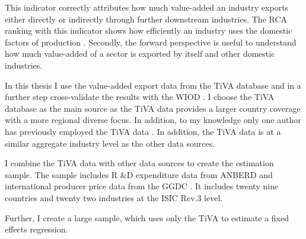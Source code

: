   This indicator correctly attributes how much value-added an industry exports either directly or indirectly through further downstream industries.
  The RCA ranking with this indicator shows how efficiently an industry uses the domestic factors of production  \textcite{baldwin}. %
Secondly, the forward perspective is useful to understand how much value-added of a sector is exported by itself and other domestic industries.
\par %
 In this thesis I use the value-added export data from the TiVA \textcite{tiva2} database and in a further step cross-validate the results with the WIOD \textcite{Timmer2012}.
I choose the TiVA database as the main source as the TiVA data provides a larger country coverage with a more regional diverse focus.
In addition, to my knowledge only one author has previously employed the TiVA data  \parencite{johnson}.
In addition, the TiVA data is at a similar aggregate industry level as the other data sources. \par
I combine the TiVA data with other data sources to create the estimation sample.
The sample includes R \&D expenditure data from \textcite{stan2} ANBERD and  international producer price data from the GGDC  \parencite{Inklaar2012}.
It includes twenty nine countries and twenty two industries at the ISIC Rev.3 level. \par
Further, I create a large sample, which uses only the TiVA to estimate a fixed effects regression.
